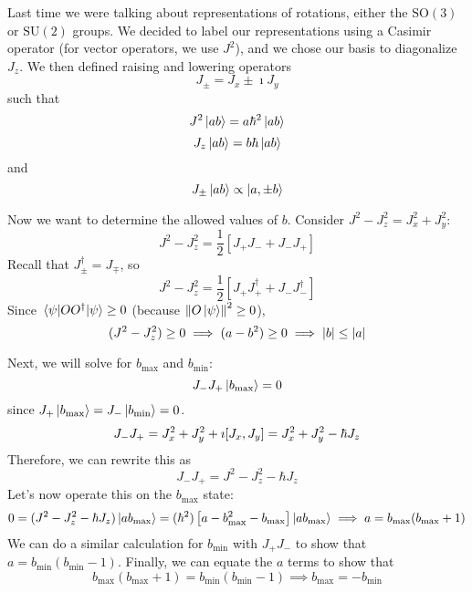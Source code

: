 \documentclass[a4paper,twoside,master.tex]{subfiles}
\begin{document}

Last time we were talking about representations of rotations, either the $\text{SO}(3)$ or $\text{SU}(2)$ groups. We decided to label our representations using a Casimir operator (for vector operators, we use $ J^2 $), and we chose our basis to diagonalize $ J_z $. We then defined raising and lowering operators
\begin{equation}
    J_{\pm} = J_x \pm \imath J_y
\end{equation}
such that
\begin{equation}
    J^2\ket{ab} = a \hbar^2\ket{ab}
\end{equation}
\begin{equation}
    J_z\ket{ab} = b \hbar\ket{ab}
\end{equation}
and
\begin{equation}
    J_{\pm}\ket{ab} \propto\ket{a, \pm b}
\end{equation}

Now we want to determine the allowed values of $ b $. Consider $ J^2 - J_z^2 = J_x^2 + J_y^2 $:
\begin{equation}
    J^2 - J_z^2 = \frac{1}{2} \left[ J_+ J_- + J_- J_+ \right]
\end{equation}
Recall that $ J_{\pm}^\dagger = J_{\mp} $, so
\begin{equation}
    J^2 - J_z^2 = \frac{1}{2} \left[ J_+ J_+^\dagger + J_- J_-^\dagger \right]
\end{equation}
Since $ \ev{OO^\dagger}{\psi} \geq 0 $ (because $ \norm{O\ket{\psi}}^2 \geq 0 $),
\begin{equation}
    (J^2 - J_z^2) \geq 0 \implies (a - b^2) \geq 0 \implies \abs{b} \leq \abs{a}
\end{equation}

Next, we will solve for $ b_{\text{max}} $ and $ b_{\text{min}} $:
\begin{equation}
    J_- J_+\ket{b_{\text{max}}} = 0
\end{equation}
since $ J_+\ket{b_{\text{max}}} = J_-\ket{b_{\text{min}}} = 0 $.
\begin{equation}
    J_- J_+ = J_x^2 + J_y^2 + \imath \comm{J_x}{J_y} = J_x^2 + J_y^2 - \hbar J_z
\end{equation}
Therefore, we can rewrite this as
\begin{equation}
    J_- J_+ = J^2 - J_z^2 - \hbar J_z
\end{equation}
Let's now operate this on the $ b_{\text{max}} $ state:
\begin{equation}
    0 = (J^2 - J_z^2 - \hbar J_z)\ket{a b_{\text{max}}} = (\hbar^2)\left[ a - b^2_{\text{max}} - b_{\text{max}} \right]\ket{ab_{\text{max}}} \implies a = b_{\text{max}}(b_{\text{max}} + 1)
\end{equation}
We can do a similar calculation for $ b_{\text{min}} $ with $ J_+J_- $ to show that $ a = b_{\text{min}} (b_{\text{min}} - 1) $. Finally, we can equate the $ a $ terms to show that
\begin{equation}
    b_{\text{max}} (b_{\text{max}} + 1) = b_{\text{min}} (b_{\text{min}} - 1) \implies b_{\text{max}} = - b_{\text{min}}
\end{equation}
\end{document}
